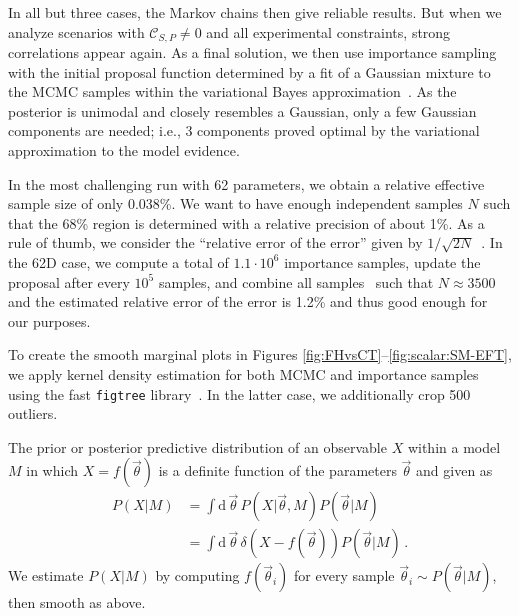 \documentclass[twocolumn,epjc3]{svjour3}
\numberwithin{equation}{section}
\def \nn{\nonumber\\}
\newcommand{\wilson}[2][{}]{\mathcal{C}_{#2}^{\mathrm{#1}}}
\renewcommand{\[}{\big[}
\renewcommand{\]}{\big]}
\renewcommand{\(}{\big(}
\renewcommand{\)}{\big)}
\def \vecth{\vec{\theta}}
\newcommand\rmdx[1]{\mbox{d} \, #1 \,}
\begin{document}
In all but three cases, the Markov chains then give reliable
results. But when we analyze scenarios with $\wilson{S,P} \ne 0$ and
all experimental constraints, strong correlations appear again. As a
final solution, we then use importance sampling with the initial
proposal function determined by a fit of a Gaussian mixture to the
MCMC samples within the variational Bayes
approximation~\cite{Jahn:2015}. As the posterior is unimodal and
closely resembles a Gaussian, only a few Gaussian components are
needed; i.e., 3 components proved optimal by the variational
approximation to the model evidence.

In the most challenging run with 62 parameters, we obtain a relative
effective sample size of only 0.038\%. We want to have enough
independent samples $N$ such that the 68\% region is determined with a
relative precision of about 1\%. As a rule of thumb, we consider the
``relative error of the error'' given by $1/\sqrt{2
  N}$~\cite[ch. 37]{Agashe:2014kda}.  In the 62D case, we compute a
total of $1.1\cdot10^6$ importance samples, update the proposal after
every $10^5$ samples, and combine all samples~\cite{Jahn:2015} such
that $N \approx 3500$ and the estimated relative error of the error is
1.2\% and thus good enough for our purposes.

To create the smooth marginal plots in Figures
\ref{fig:FHvsCT}--\ref{fig:scalar:SM-EFT}, we apply kernel density estimation
for both MCMC and importance samples using the fast \texttt{figtree}
library~\cite{morariu08figtree}. In the latter case, we additionally crop 500
outliers.

The prior or posterior predictive distribution of an observable $X$ within a
model $M$ in which $X=f(\vecth)$ is a definite function of the
parameters $\vecth$ {and} given as
\begin{align}
  \label{eq:predictive}
  P(X | M) &= \int \rmdx{\vecth} P(X|\vecth,M) P(\vecth|M)\nn
  &= \int \rmdx{\vecth} \delta(X - f(\vecth)) P(\vecth|M) \,.
\end{align}
We estimate $P(X|M)$ by computing $f(\vecth_i)$ for every sample $\vecth_i \sim
P(\vecth|M)$, then smooth as above.

%
%
%

%
%



\end{document}

